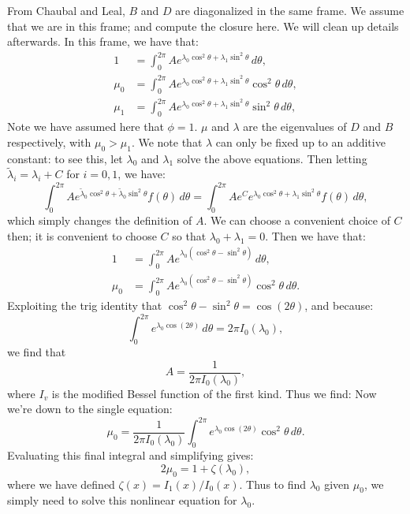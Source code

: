\documentclass{article}
\begin{document}
From Chaubal and Leal, $B$ and $D$ are diagonalized in the same frame. We assume that we are in this frame; and compute the closure here. We will clean up details afterwards. In this frame, we have that:
\begin{subequations}
    \begin{align}
        1 &= \int_0^{2\pi}Ae^{\lambda_0\cos^2\theta + \lambda_1\sin^2\theta}\,d\theta,   \\
        \mu_0 &= \int_0^{2\pi}Ae^{\lambda_0\cos^2\theta + \lambda_1\sin^2\theta}\cos^2\theta\,d\theta,   \\
        \mu_1 &= \int_0^{2\pi}Ae^{\lambda_0\cos^2\theta + \lambda_1\sin^2\theta}\sin^2\theta\,d\theta,
    \end{align}
\end{subequations}
Note we have assumed here that $\phi=1$. $\mu$ and $\lambda$ are the eigenvalues of $D$ and $B$ respectively, with $\mu_0>\mu_1$. We note that $\lambda$ can only be fixed up to an additive constant: to see this, let $\lambda_0$ and $\lambda_1$ solve the above equations.  Then letting $\tilde\lambda_i=\lambda_i+C$ for $i=0,1$, we have:
\begin{equation}
    \int_0^{2\pi}Ae^{\tilde\lambda_0\cos^2\theta + \tilde\lambda_0\sin^2\theta}f(\theta)\,d\theta = \int_0^{2\pi}Ae^{C}e^{\lambda_0\cos^2\theta + \lambda_1\sin^2\theta}f(\theta)\,d\theta,
\end{equation}
which simply changes the definition of $A$. We can choose a convenient choice of $C$ then; it is convenient to choose $C$ so that $\lambda_0 + \lambda_1 = 0$. Then we have that:
\begin{subequations}
    \begin{align}
        1 &= \int_0^{2\pi}Ae^{\lambda_0(\cos^2\theta - \sin^2\theta)}\,d\theta,   \\
        \mu_0 &= \int_0^{2\pi}Ae^{\lambda_0(\cos^2\theta - \sin^2\theta)}\cos^2\theta\,d\theta.
    \end{align}
\end{subequations}
Exploiting the trig identity that $\cos^2\theta-\sin^2\theta=\cos(2\theta)$, and because:
\begin{equation}
    \int_0^{2\pi}e^{\lambda_0\cos(2\theta)}\,d\theta = 2\pi I_0(\lambda_0),
\end{equation}
we find that
\begin{equation}
    A = \frac{1}{2\pi I_0(\lambda_0)},
\end{equation}
where $I_v$ is the modified Bessel function of the first kind. Thus we find:
Now we're down to the single equation:
\begin{equation}
    \mu_0 = \frac{1}{2\pi I_0(\lambda_0)}\int_0^{2\pi}e^{\lambda_0\cos(2\theta)}\cos^2\theta\,d\theta.
\end{equation}
Evaluating this final integral and simplifying gives:
\begin{equation}
    2\mu_0 = 1 + \zeta(\lambda_0),
\end{equation}
where we have defined $\zeta(x)=I_1(x)/I_0(x)$. Thus to find $\lambda_0$ given $\mu_0$, we simply need to solve this nonlinear equation for $\lambda_0$.
\end{document}
